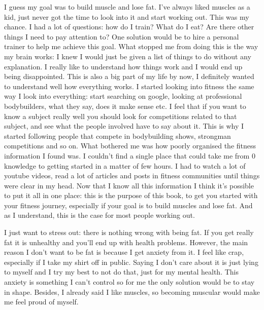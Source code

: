 \documentclass[openany, 12pt]{book}
\begin{document}
	I guess my goal was to build muscle and lose fat. I've always liked muscles as a kid, just never got the time to look into it and start
	working out. This was my chance. I had a lot of questions: how do I train? What do I eat? Are there other things I need to pay attention to?
	One solution would be to hire a personal trainer to help me achieve this goal. What stopped me from doing this is the way my brain works: I knew
	I would just be given a list of things to do without any explanation. I really like to understand how things work and I would end up being 
	disappointed. This is also a big part of my life by now, I definitely wanted to understand well how everything works. I started looking into fitness
	the same way I look into everything: start searching on google, looking at professional bodybuilders, what they say, does it make sense etc. 
	I feel that if you want to know a subject really well you should look for competitions related to that subject, and see what the people involved
	have to say about it. This is why I started following people that compete in bodybuilding shows, strongman competitions and so on. 	
	What bothered me was how poorly organised the fitness information I found was. I couldn't find a single place that could take me from 0 knowledge
	to getting started in a matter of few hours. I had to watch a lot of youtube videos, read a lot of articles and posts in fitness communities until
	things were clear in my head. Now that I know all this information I think it's possible to put it all in one place: this is the purpose of this 
	book, to get you started with your fitness journey, especially if your goal is to build muscles and lose fat. And as I understand, this is the case
	for	most people working out.
	
	I just want to stress out: there is nothing wrong with being fat. If you get really fat it is unhealthy and you'll end up with 
	health problems. However, the main reason I don't want to be fat is because I get anxiety from it. I feel like crap, especially if I take my shirt 
	off in public. Saying I don't care about it is just lying to myself and I try my best to not do that, just for my mental health. This anxiety is
	something I can't control so for me the only solution would be to stay in shape. Besides, I already said I like muscles, so becoming muscular would
	make me feel proud of myself.
	
\end{document}
